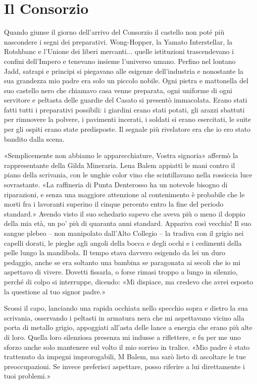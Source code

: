 \chapter{Il Consorzio}

Quando giunse il giorno dell'arrivo del Consorzio il castello non poté
più nascondere i segni dei preparativi. Wong-Hopper, la Yamato
Interstellar, la Rotshbanc e l'Unione dei liberi mercanti... quelle
istituzioni trascendevano i confini dell'Impero e tenevano insieme
l'universo umano. Perfino nel lontano Jadd, satrapi e principi si
piegavano alle esigenze dell'industria e nonostante la sua grandezza mio
padre era solo un piccolo nobile. Ogni pietra e mattonella del suo
castello nero che chiamavo casa venne preparata, ogni uniforme di ogni
servitore e peltasta delle guardie del Casato si presentò immacolata.
Erano stati fatti tutti i preparativi possibili: i giardini erano stati
potati, gli arazzi sbattuti per rimuovere la polvere, i pavimenti
incerati, i soldati si erano esercitati, le suite per gli ospiti erano
state predisposte. Il segnale più rivelatore era che io ero stato
bandito dalla scena.

«Semplicemente non abbiamo le apparecchiature, Vostra signoria» affermò
la rappresentante della Gilda Mineraria. Lena Balem appiattì le mani
contro il piano della scrivania, con le unghie color vino che
scintillavano nella rossiccia luce sovrastante. «La raffineria di Punta
Denterosso ha un notevole bisogno di riparazioni, e senza una maggiore
attenzione al contenimento è probabile che le morti fra i lavoranti
superino il cinque percento entro la fine del periodo standard.» Avendo
visto il suo schedario sapevo che aveva più o meno il doppio della mia
età, un po' più di quaranta anni standard. Appariva così vecchia! Il suo
sangue plebeo -- non manipolato dall'Alto Collegio -- la tradiva con il
grigio nei capelli dorati, le pieghe agli angoli della bocca e degli
occhi e i cedimenti della pelle lungo la mandibola. Il tempo stava
davvero esigendo da lei un duro pedaggio, anche se era soltanto una
bambina se paragonata ai secoli che io mi aspettavo di vivere. Dovetti
fissarla, o forse rimasi troppo a lungo in silenzio, perché di colpo si
interruppe, dicendo: «Mi dispiace, ma credevo che avrei esposto la
questione al tuo signor padre.»

Scossi il capo, lanciando una rapida occhiata nello specchio sopra e
dietro la sua scrivania, osservando i peltasti in armatura nera che mi
aspettavano vicino alla porta di metallo grigio, appoggiati all'asta
delle lance a energia che erano più alte di loro. Quella loro silenziosa
presenza mi indusse a riflettere, e fu per me uno sforzo anche solo
mantenere sul volto il mio sorriso in tralice. «Mio padre è stato
trattenuto da impegni improrogabili, M Balem, ma sarò lieto di ascoltare
le tue preoccupazioni. Se invece preferisci aspettare, posso riferire a
lui direttamente i tuoi problemi.»


